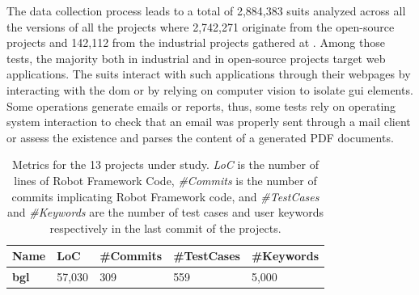 The data collection process leads to a total of 2,884,383 \gls{suit}s analyzed across all the versions of all the projects where 2,742,271 originate from the open-source projects and 142,112 from the industrial projects gathered at \BGL. Among those tests, the majority both in industrial and in open-source projects target web applications. The \gls{suit}s interact with such applications through their webpages by interacting with the \gls{dom} or by relying on computer vision to isolate \gls{gui} elements. Some operations generate emails or reports, thus, some tests rely on operating system interaction to check that an email was properly sent through a mail client or assess the existence and parses the content of a generated PDF documents.

\begin{table}
\centering

\caption{Metrics for the 13 projects under study. \emph{LoC} is the number of lines of Robot Framework Code, \emph{\#Commits} is the number of commits implicating Robot Framework code, and \emph{\#TestCases} and \emph{\#Keywords} are the number of test cases and user keywords respectively in the last commit of the projects.}
\label{tab:projects}

\begin{tabular}{>{\raggedright}p{0.9in}>{\raggedleft}p{0.7in}>{\raggedleft}p{0.7in}>{\raggedleft}p{0.7in}>{\raggedleft}p{0.7in}}

\toprule
\scriptsize{\textbf{Name}} & \scriptsize{\textbf{LoC}} & \scriptsize{\textbf{\#Commits}} & \scriptsize{\textbf{\#TestCases}} & \scriptsize{\textbf{\#Keywords}} \tabularnewline
\toprule

\scriptsize{\textbf{bgl}} & \scriptsize{57,030} & \scriptsize{309} & \scriptsize{559} & \scriptsize{5,000} \tabularnewline

\midrule


\end{tabular}
\end{table}
